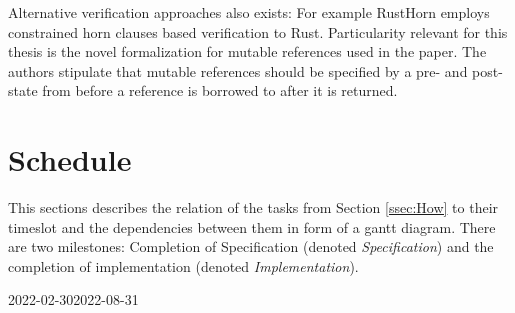 \documentclass[11pt]{article}
\begin{document}
Alternative verification approaches also exists: For example RustHorn\cite{matsushita_rusthorn_2020} employs constrained horn clauses based verification to Rust. Particularity relevant for this thesis is the novel formalization for mutable references used in the paper. The authors stipulate that mutable references should be specified by a pre- and post-state from before a reference is borrowed to after it is returned.

\section{Schedule} \label{sec:schedule}

This sections describes the relation of the tasks from Section \ref{ssec:How} to their timeslot and the dependencies between them in form of a gantt diagram. There are two milestones: Completion of Specification (denoted \textit{Specification}) and the completion of implementation (denoted \textit{Implementation}).

\begin{ganttchart}[
	time slot format=isodate,
	x unit=0.04cm,
	today = 2022-02-30,
	link bulge=2.5,
	]{2022-02-30}{2022-08-31}
 \\
 \\
	 \\
		 \\
			 \\
				 \\

 \\
	 \\
		 \\



 \\
	 \\
		 \\
\end{ganttchart}
\end{document}
